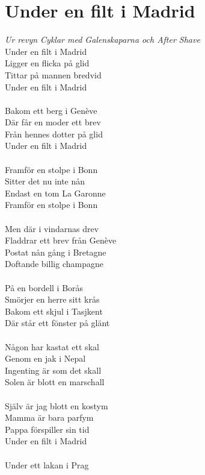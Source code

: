 \newpage
\section{Under en filt i Madrid}
\textit{Ur revyn Cyklar med Galenskaparna och After Shave}
\vspace{2mm}\\
Under en filt i Madrid\\
Ligger en flicka på glid\\
Tittar på mannen bredvid\\
Under en filt i Madrid\\
\\
Bakom ett berg i Genève\\
Där får en moder ett brev\\
Från hennes dotter på glid\\
Under en filt i Madrid\\
\\
Framför en stolpe i Bonn\\
Sitter det nu inte nån\\
Endast en tom La Garonne\\
Framför en stolpe i Bonn\\
\\
Men där i vindarnas drev\\
Fladdrar ett brev från Genève\\
Postat nån gång i Bretagne\\
Doftande billig champagne\\
\\
På en bordell i Borås\\
Smörjer en herre sitt krås\\
Bakom ett skjul i Tasjkent\\
Där står ett fönster på glänt\\
\\
Någon har kastat ett skal\\
Genom en jak i Nepal\\
Ingenting är som det skall\\
Solen är blott en marschall\\
\\
Själv är jag blott en kostym\\
Mamma är bara parfym\\
Pappa förspiller sin tid\\
Under en filt i Madrid\\
\\
Under ett lakan i Prag\\
